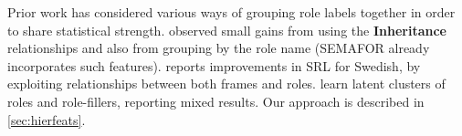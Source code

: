 \documentclass[11pt,a4paper]{article}
\begin{document}
Prior work has %
considered various ways of grouping role labels together in order to share statistical strength. 
\citet{matsubayashi-09} observed small gains from using the \textbf{Inheritance} relationships %
and also from grouping by the role name (SEMAFOR already incorporates such features).
\citet{johansson-12} reports improvements in SRL for Swedish, by exploiting relationships between both frames and roles.
\citet{baldewein-04} learn latent clusters of roles and role-fillers, reporting mixed results.
Our approach is described in \cref{sec:hierfeats}.
\end{document}
